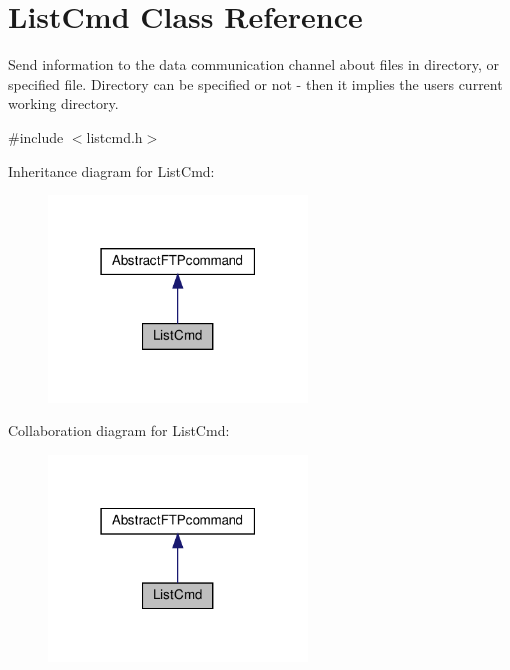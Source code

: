 \hypertarget{classListCmd}{}\section{List\+Cmd Class Reference}
\label{classListCmd}


Send information to the data communication channel about files in directory, or specified file. Directory can be specified or not -\/ then it implies the user\textquotesingle{}s current working directory.  




{\ttfamily \#include $<$listcmd.\+h$>$}



Inheritance diagram for List\+Cmd\+:\nopagebreak
\begin{figure}[H]
\begin{center}
\leavevmode
\includegraphics[width=195pt]{d9/d6f/classListCmd__inherit__graph}
\end{center}
\end{figure}


Collaboration diagram for List\+Cmd\+:\nopagebreak
\begin{figure}[H]
\begin{center}
\leavevmode
\includegraphics[width=195pt]{df/d4b/classListCmd__coll__graph}
\end{center}
\end{figure}
